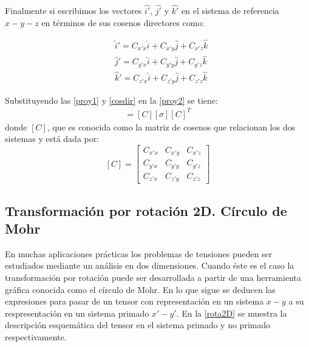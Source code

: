\documentclass[../notas medios.tex]{subfiles}
\begin{document}
%
Finalmente si escribimos los vectores $\hat{i'}$, $\hat{j'}$ y $\hat{k'}$ en el sistema de referencia $x-y-z$ en términos de sus cosenos directores como:

\begin{equation}
\begin{aligned}
&\hat i' = C_{x'x}\hat i + C_{x'y}\hat j + C_{x'z}\hat k \\
&\hat j' = C_{y'x}\hat i + C_{y'y}\hat j + C_{y'z}\hat k \\
&\hat k' = C_{z'x}\hat i + C_{z'y}\hat j + C_{z'z}\hat k
\end{aligned}
\label{cosdir}
\end{equation}

Substituyendo las \cref{proy1} y \cref{cosdir} en la \cref{proy2} se tiene:
%
\begin{align}
[\sigma'] = [C] [\sigma] {[C]^T}
\label{rotacion}
\end{align}
%
donde $[C]$,  que es conocida como la matriz de cosenos que relacionan los dos
sistemas y está dada por: \\
\[
[C]
= 
\begin{bmatrix}
    C_{x'x} & C_{x'y} & C_{x'z} \\
    C_{y'x} & C_{y'y} & C_{y'z} \\
    C_{z'x} & C_{z'y} & C_{z'z}
\end{bmatrix}
\]

\subsection{Transformación por rotación 2D. Círculo de Mohr}
%
En muchas aplicaciones prácticas los problemas de tensiones pueden ser 
estudiados mediante un análisis en dos dimensiones. Cuando éste es el caso la 
transformación por rotación puede ser desarrollada a partir de una herramienta 
gráfica conocida como el círculo de Mohr. En lo que sigue se deducen las 
expresiones para pasar de un tensor con representación en un sistema $x-y$ a su 
respresentación en un sistema primado $x'-y'$. En la \cref{rota2D} se muestra 
la descripción esquemática del tensor en el sistema primado y no primado 
respectivamente. 
\end{document}
